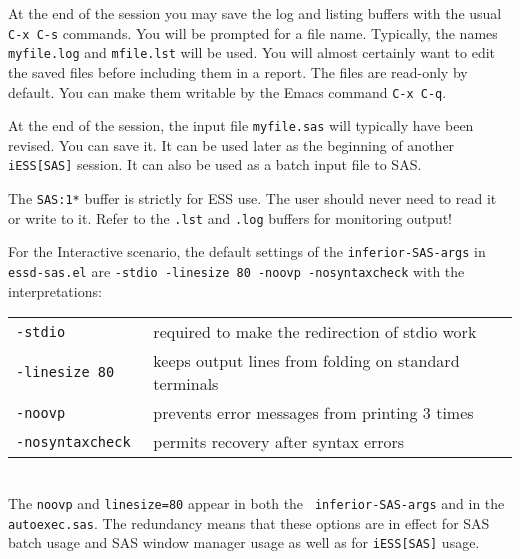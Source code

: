 \documentclass{article}
\begin{document}
 At the end of the session you may save the log and listing
 buffers with the usual {\tt C-x C-s} commands.  You will be prompted
 for a file name.  Typically, the names {\tt myfile.log} and {\tt mfile.lst}
 will be used.  You will almost certainly want to edit the saved
 files before including them in a report.  The files are
 read-only by default.  You can make them writable by the Emacs
 command {\tt C-x C-q}.

 At the end of the session, the input file {\tt myfile.sas} will
 typically have been revised.  You can save it.  It can be used
 later as the beginning of another {\tt iESS[SAS]} session.  It can
 also be used as a batch input file to SAS.

 The {\tt *SAS:1*} buffer is strictly for ESS use.  The user should
 never need to read it or write to it.  Refer to the {\tt .lst} and
 {\tt .log} buffers for monitoring output!




For the Interactive scenario,
the default settings of the {\tt inferior-SAS-args} in {\tt essd-sas.el}
are {\tt -stdio -linesize 80 -noovp -nosyntaxcheck}
with the interpretations:\\
\begin{tabular}{ll}
\tt  -stdio          &required to make the redirection of stdio work       \\
\tt  -linesize 80    &keeps output lines from folding on standard terminals\\
\tt  -noovp          &prevents error messages from printing 3 times        \\
\tt  -nosyntaxcheck  &permits recovery after syntax errors                 \\
\end{tabular}\\
The {\tt noovp} and {\tt linesize=80} appear in both the {\tt
inferior-SAS-args} and in the {\tt autoexec.sas}.  The redundancy means that
these options are in effect for SAS batch usage and SAS window manager
usage as well as for {\tt iESS[SAS]} usage.
\end{document}
